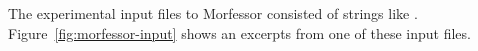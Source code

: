 The experimental input files to Morfessor consisted of strings like . Figure~\ref{fig:morfessor-input} shows an excerpts from one of these input files.
%

%
%
		
